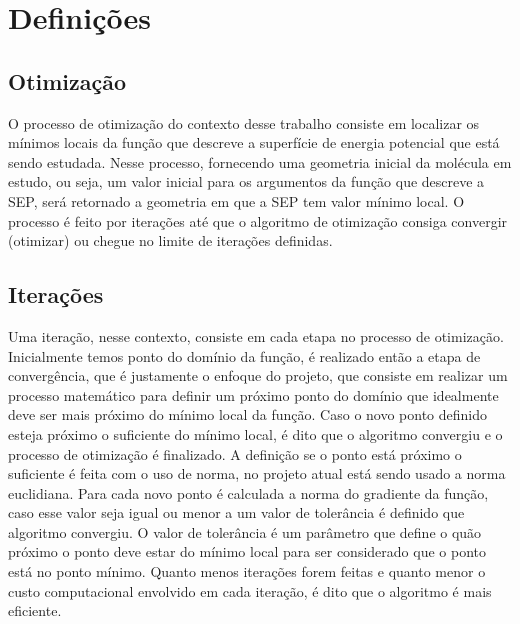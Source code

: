 \section{Definições}
\label{sec:definitions}

\subsection{Otimização}

O processo de otimização do contexto desse trabalho consiste em localizar os mínimos locais da função que descreve a superfície de energia potencial que está sendo estudada. Nesse processo, fornecendo uma geometria inicial da molécula em estudo, ou seja, um valor inicial para os argumentos da função que descreve a SEP, será retornado a geometria em que a SEP tem valor mínimo local. O processo é feito por iterações até que o algoritmo de otimização consiga convergir (otimizar) ou chegue no limite de iterações definidas.

\subsection{Iterações}

Uma iteração, nesse contexto, consiste em cada etapa no processo de otimização. Inicialmente temos ponto do domínio da função, é realizado então a etapa de convergência, que é justamente o enfoque do projeto, que consiste em realizar um processo matemático para definir um próximo ponto do domínio que idealmente deve ser mais próximo do mínimo local da função. Caso o novo ponto definido esteja próximo o suficiente do mínimo local, é dito que o algoritmo convergiu e o processo de otimização é finalizado. A definição se o ponto está próximo o suficiente é feita com o uso de norma, no projeto atual está sendo usado a norma euclidiana. Para cada novo ponto é calculada a norma do gradiente da função, caso esse valor seja igual ou menor a um valor de tolerância é definido que algoritmo convergiu. O valor de tolerância é um parâmetro que define o quão próximo o ponto deve estar do mínimo local para ser considerado que o ponto está no ponto mínimo. Quanto menos iterações forem feitas e quanto menor o custo computacional envolvido em cada iteração, é dito que o algoritmo é mais eficiente.
